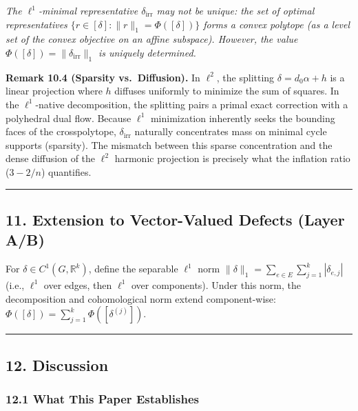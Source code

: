 \documentclass[
]{article}
\begin{document}
\emph{The \(\ell^1\)-minimal representative \(\delta_{\text{irr}}\) may
not be unique: the set of optimal representatives
\(\{r \in [\delta] : \|r\|_1 = \Phi([\delta])\}\) forms a convex
polytope (as a level set of the convex objective on an affine subspace).
However, the value \(\Phi([\delta]) = \|\delta_{\text{irr}}\|_1\) is
uniquely determined.}

\textbf{Remark 10.4 (Sparsity vs.~Diffusion).} In \(\ell^2\), the
splitting \(\delta = d_0 \alpha + h\) is a linear projection where \(h\)
diffuses uniformly to minimize the sum of squares. In the
\(\ell^1\)-native decomposition, the splitting pairs a primal exact
correction with a polyhedral dual flow. Because \(\ell^1\) minimization
inherently seeks the bounding faces of the crosspolytope,
\(\delta_{\text{irr}}\) naturally concentrates mass on minimal cycle
supports (sparsity). The mismatch between this sparse concentration and
the dense diffusion of the \(\ell^2\) harmonic projection is precisely
what the inflation ratio (\(3 - 2/n\)) quantifies.

\begin{center}\rule{0.5\linewidth}{0.5pt}\end{center}

\subsection{\texorpdfstring{11. Extension to Vector-Valued Defects
\textbf{(Layer
A/B)}}{11. Extension to Vector-Valued Defects (Layer A/B)}}\label{extension-to-vector-valued-defects-layer-ab}

For \(\delta \in C^1(G, \mathbb{R}^k)\), define the separable \(\ell^1\)
norm \(\|\delta\|_1 = \sum_{e \in E} \sum_{j=1}^k |\delta_{e,j}|\)
(i.e., \(\ell^1\) over edges, then \(\ell^1\) over components). Under
this norm, the decomposition and cohomological norm extend
component-wise: \(\Phi([\delta]) = \sum_{j=1}^k \Phi([\delta^{(j)}])\).

\begin{center}\rule{0.5\linewidth}{0.5pt}\end{center}

\subsection{12. Discussion}\label{discussion}

\subsubsection{12.1 What This Paper
Establishes}\label{what-this-paper-establishes}
\end{document}
